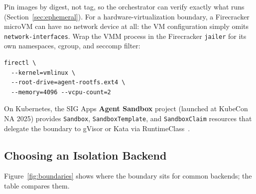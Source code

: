 \documentclass[11pt,letterpaper]{article}
\begin{document}
Pin images by digest, not tag, so the orchestrator can verify exactly what runs (Section~\ref{sec:ephemeral}). For a hardware-virtualization boundary, a Firecracker microVM can have no network device at all: the VM configuration simply omits \texttt{network-interfaces}. Wrap the VMM process in the Firecracker \texttt{jailer} for its own namespaces, cgroup, and seccomp filter:
\begin{lstlisting}[style=shell]
firectl \
  --kernel=vmlinux \
  --root-drive=agent-rootfs.ext4 \
  --memory=4096 --vcpu-count=2
\end{lstlisting}

On Kubernetes, the SIG Apps \textbf{Agent Sandbox} project (launched at KubeCon NA 2025) provides \texttt{Sandbox}, \texttt{SandboxTemplate}, and \texttt{SandboxClaim} resources that delegate the boundary to gVisor or Kata via RuntimeClass~\cite{agentsandbox}.

\subsection{Choosing an Isolation Backend}

Figure~\ref{fig:boundaries} shows where the boundary sits for common backends; the table compares them.
\end{document}
